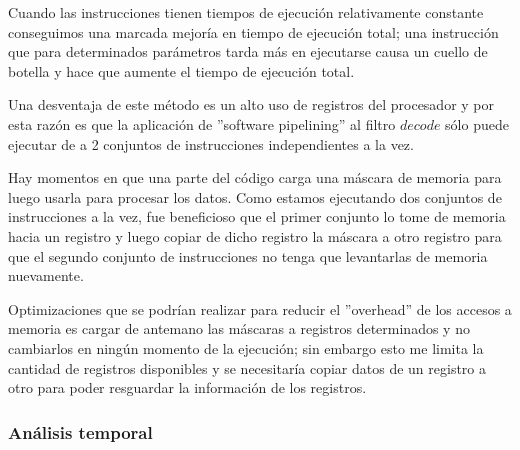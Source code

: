 		Cuando las instrucciones tienen tiempos de ejecución relativamente constante conseguimos una marcada mejoría en tiempo de ejecución total; una instrucción que para determinados parámetros tarda más en ejecutarse causa un cuello de botella y hace que aumente el tiempo de ejecución total.

		Una desventaja de este método es un alto uso de registros del procesador y por esta razón es que la aplicación de ''software pipelining'' al filtro $decode$ sólo puede ejecutar de a 2 conjuntos de instrucciones independientes a la vez.

		Hay momentos en que una parte del código carga una máscara de memoria para luego usarla para procesar los datos. Como estamos ejecutando dos conjuntos de instrucciones a la vez, fue beneficioso que el primer conjunto lo tome de memoria hacia un registro y luego copiar de dicho registro la máscara a otro registro para que el segundo conjunto de instrucciones no tenga que levantarlas de memoria nuevamente.

		Optimizaciones que se podrían realizar para reducir el ''overhead'' de los accesos a memoria es cargar de antemano las máscaras a registros determinados y no cambiarlos en ningún momento de la ejecución; sin embargo esto me limita la cantidad de registros disponibles y se necesitaría copiar datos de un registro a otro para poder resguardar la información de los registros.
		
	\subsubsection{An\'alisis temporal}